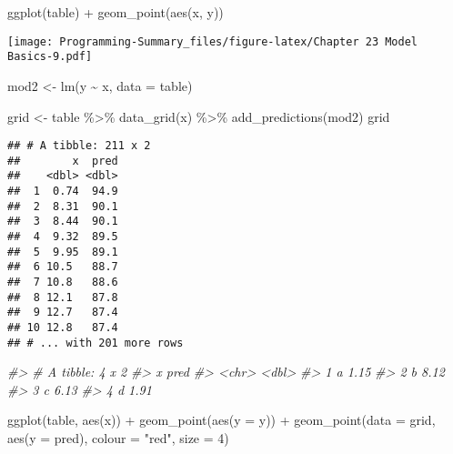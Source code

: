 \documentclass[
]{article}
\newenvironment{Shaded}{\begin{snugshade}}{\end{snugshade}}
\newcommand{\AttributeTok}[1]{\textcolor[rgb]{0.77,0.63,0.00}{#1}}
\newcommand{\CommentTok}[1]{\textcolor[rgb]{0.56,0.35,0.01}{\textit{#1}}}
\newcommand{\DecValTok}[1]{\textcolor[rgb]{0.00,0.00,0.81}{#1}}
\newcommand{\FunctionTok}[1]{\textcolor[rgb]{0.00,0.00,0.00}{#1}}
\newcommand{\NormalTok}[1]{#1}
\newcommand{\OtherTok}[1]{\textcolor[rgb]{0.56,0.35,0.01}{#1}}
\newcommand{\SpecialCharTok}[1]{\textcolor[rgb]{0.00,0.00,0.00}{#1}}
\newcommand{\StringTok}[1]{\textcolor[rgb]{0.31,0.60,0.02}{#1}}
\begin{document}
\begin{Shaded}
\begin{Highlighting}[]
\FunctionTok{ggplot}\NormalTok{(table) }\SpecialCharTok{+} 
  \FunctionTok{geom\_point}\NormalTok{(}\FunctionTok{aes}\NormalTok{(x, y))}
\end{Highlighting}
\end{Shaded}

\texttt{[image: Programming-Summary\_files/figure-latex/Chapter 23 Model Basics-9.pdf]}

\begin{Shaded}
\begin{Highlighting}[]
\NormalTok{mod2 }\OtherTok{\textless{}{-}} \FunctionTok{lm}\NormalTok{(y }\SpecialCharTok{\textasciitilde{}}\NormalTok{ x, }\AttributeTok{data =}\NormalTok{ table)}

\NormalTok{grid }\OtherTok{\textless{}{-}}\NormalTok{ table }\SpecialCharTok{\%\textgreater{}\%} 
  \FunctionTok{data\_grid}\NormalTok{(x) }\SpecialCharTok{\%\textgreater{}\%} 
  \FunctionTok{add\_predictions}\NormalTok{(mod2)}
\NormalTok{grid}
\end{Highlighting}
\end{Shaded}

\begin{verbatim}
## # A tibble: 211 x 2
##        x  pred
##    <dbl> <dbl>
##  1  0.74  94.9
##  2  8.31  90.1
##  3  8.44  90.1
##  4  9.32  89.5
##  5  9.95  89.1
##  6 10.5   88.7
##  7 10.8   88.6
##  8 12.1   87.8
##  9 12.7   87.4
## 10 12.8   87.4
## # ... with 201 more rows
\end{verbatim}

\begin{Shaded}
\begin{Highlighting}[]
\CommentTok{\#\textgreater{} \# A tibble: 4 x 2}
\CommentTok{\#\textgreater{}   x      pred}
\CommentTok{\#\textgreater{}   \textless{}chr\textgreater{} \textless{}dbl\textgreater{}}
\CommentTok{\#\textgreater{} 1 a      1.15}
\CommentTok{\#\textgreater{} 2 b      8.12}
\CommentTok{\#\textgreater{} 3 c      6.13}
\CommentTok{\#\textgreater{} 4 d      1.91}

\FunctionTok{ggplot}\NormalTok{(table, }\FunctionTok{aes}\NormalTok{(x)) }\SpecialCharTok{+} 
  \FunctionTok{geom\_point}\NormalTok{(}\FunctionTok{aes}\NormalTok{(}\AttributeTok{y =}\NormalTok{ y)) }\SpecialCharTok{+}
  \FunctionTok{geom\_point}\NormalTok{(}\AttributeTok{data =}\NormalTok{ grid, }\FunctionTok{aes}\NormalTok{(}\AttributeTok{y =}\NormalTok{ pred), }\AttributeTok{colour =} \StringTok{"red"}\NormalTok{, }\AttributeTok{size =} \DecValTok{4}\NormalTok{)}
\end{Highlighting}
\end{Shaded}
\end{document}
